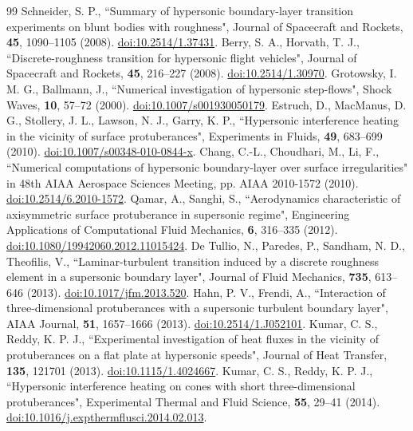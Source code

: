 \documentclass[aip,pof,preprint,floatfix,amsmath,amssymb]{revtex4-2}
\begin{document}
\begin{thebibliography}{99}
 Schneider, S. P., ``Summary of hypersonic boundary-layer transition experiments on blunt bodies with roughness", Journal of Spacecraft and Rockets, \textbf{45}, 1090--1105 (2008). \href{https://doi.org/10.2514/1.37431}{doi:10.2514/1.37431}.
 Berry, S. A., Horvath, T. J., ``Discrete-roughness transition for hypersonic flight vehicles", Journal of Spacecraft and Rockets, \textbf{45}, 216--227 (2008). \href{https://doi.org/10.2514/1.30970}{doi:10.2514/1.30970}.
 Grotowsky, I. M. G., Ballmann, J., ``Numerical investigation of hypersonic step-flows", Shock Waves, \textbf{10}, 57--72 (2000). \href{https://doi.org/10.1007/s001930050179}{doi:10.1007/s001930050179}.
 Estruch, D., MacManus, D. G., Stollery, J. L., Lawson, N. J., Garry, K. P., ``Hypersonic interference heating in the vicinity of surface protuberances", Experiments in Fluids, \textbf{49}, 683--699 (2010). \href{https://doi.org/10.1007/s00348-010-0844-x}{doi:10.1007/s00348-010-0844-x}.
 Chang, C.-L., Choudhari, M., Li, F., ``Numerical computations of hypersonic boundary-layer over surface irregularities" in 48th AIAA Aerospace Sciences Meeting, pp. AIAA 2010-1572 (2010). \href{https://doi.org/10.2514/6.2010-1572}{doi:10.2514/6.2010-1572}.
 Qamar, A., Sanghi, S., ``Aerodynamics characteristic of axisymmetric surface protuberance in supersonic regime", Engineering Applications of Computational Fluid Mechanics, \textbf{6}, 316--335 (2012). \href{https://doi.org/10.1080/19942060.2012.11015424}{doi:10.1080/19942060.2012.11015424}.
 De Tullio, N., Paredes, P., Sandham, N. D., Theofilis, V., ``Laminar-turbulent transition induced by a discrete roughness element in a supersonic boundary layer", Journal of Fluid Mechanics, \textbf{735}, 613--646 (2013). \href{https://doi.org/10.1017/jfm.2013.520}{doi:10.1017/jfm.2013.520}.
 Hahn, P. V., Frendi, A., ``Interaction of three-dimensional protuberances with a supersonic turbulent boundary layer", AIAA Journal, \textbf{51}, 1657--1666 (2013). \href{https://doi.org/10.2514/1.J052101}{doi:10.2514/1.J052101}.
 Kumar, C. S., Reddy, K. P. J., ``Experimental investigation of heat fluxes in the vicinity of protuberances on a flat plate at hypersonic speeds", Journal of Heat Transfer, \textbf{135}, 121701 (2013). \href{https://doi.org/10.1115/1.4024667}{doi:10.1115/1.4024667}.
 Kumar, C. S., Reddy, K. P. J., ``Hypersonic interference heating on cones with short three-dimensional protuberances", Experimental Thermal and Fluid Science, \textbf{55}, 29--41 (2014). \href{https://doi.org/10.1016/j.expthermflusci.2014.02.013}{doi:10.1016/j.expthermflusci.2014.02.013}.

\end{thebibliography}
\end{document}
